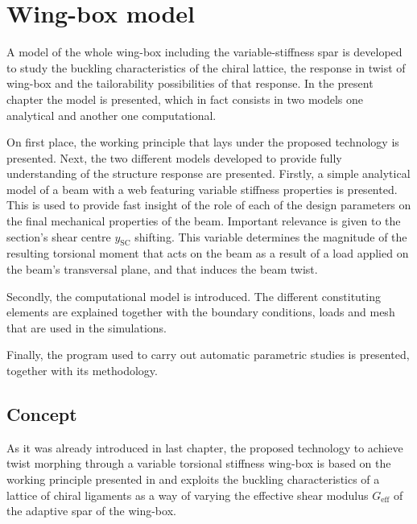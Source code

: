 \chapter{Wing-box model} \label{chap:Model}
  
  A model of the whole wing-box including the variable-stiffness spar is developed to study the buckling characteristics of the chiral lattice, the response in twist of wing-box and the tailorability possibilities of that response. In the present chapter the model is presented, which in fact consists in two models one analytical and another one computational. 

  On first place, the working principle that lays under the proposed technology is presented. Next, the two different models developed to provide fully understanding of the structure response are presented. Firstly, a simple analytical model of a beam with a web featuring variable stiffness properties is presented. This is used to provide fast insight of the role of each of the design parameters on the final mechanical properties of the beam. Important relevance is given to the section's shear centre $y_{\mathrm{SC}}$ shifting. This variable determines the magnitude of the resulting torsional moment that acts on the beam as a result of a load applied on the beam's transversal plane, and that induces the beam twist.

  Secondly, the computational model is introduced. The different constituting elements are explained together with the boundary conditions, loads and mesh that are used in the simulations.

  Finally, the program used to carry out automatic parametric studies is presented, together with its methodology.

\section{Concept} \label{sec:concept_Model}

  As it was already introduced in last chapter, the proposed technology to achieve twist morphing through a variable torsional stiffness wing-box is based on the working principle presented in \cite{Raither2013a} and exploits the buckling characteristics of a lattice of chiral ligaments as a way of varying the effective shear modulus $G_{\mathrm{eff}}$ of the adaptive spar of the wing-box.

